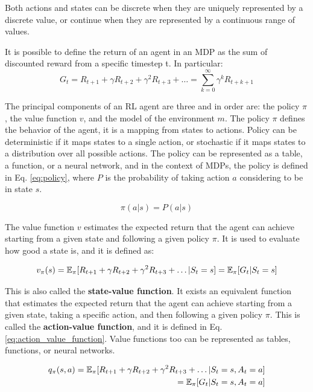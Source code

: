 Both actions and states can be discrete when they are uniquely represented by a discrete value, or continue when they are represented by a continuous range of values.

It is possible to define the return of an agent in an MDP as the sum of discounted reward from a specific timestep t.
In particular:
\begin{equation} \label{eq:return}
    G_t = R_{t+1} + \gamma R_{t+2} + \gamma^2 R_{t+3} + \dots = \sum_{k=0}^{\infty} \gamma^k R_{t+k+1}
\end{equation}

The principal components of an RL agent are three and in order are: the policy $\pi$, the value function $v$, and the model of the environment $m$.
The policy $\pi$ defines the behavior of the agent, it is a mapping from states to actions.
Policy can be deterministic if it maps states to a single action, or stochastic if it maps states to a distribution over all possible actions.
The policy can be represented as a table, a function, or a neural network, and in the context of MDPs, the policy is defined in Eq. \ref{eq:policy}, where $P$ is the probability of taking action $a$ considering to be in state $s$.

\begin{equation} \label{eq:policy}
    \pi(a|s) = P(a|s)
\end{equation}



The value function $v$ estimates the expected return that the agent can achieve starting from a given state and following a given policy $\pi$.
It is used to evaluate how good a state is, and it is defined as:

\begin{equation} \label{eq:value_function}
    v_{\pi}(s) = \operatorname{\mathbb{E}}_{\pi}[R_{t+1} + \gamma R_{t+2} + \gamma^2 R_{t+3} + \dots | S_t = s] = \operatorname{\mathbb{E}}_{\pi}[G_t | S_t = s]
\end{equation}

This is also called the \textbf{state-value function}.
It exists an equivalent function that estimates the expected return that the agent can achieve starting from a given state, taking a specific action, and then following a given policy $\pi$.
This is called the \textbf{action-value function}, and it is defined in Eq. \ref{eq:action_value_function}.
Value functions too can be represented as tables, functions, or neural networks.

\begin{equation} \label{eq:action_value_function}
\begin{split}
    q_{\pi}(s, a) = \operatorname{\mathbb{E}}_{\pi}[R_{t+1} + \gamma R_{t+2} + \gamma^2 R_{t+3} + \dots | S_t = s, A_t = a] \\
    = \operatorname{\mathbb{E}}_{\pi}[G_t | S_t = s, A_t = a]
\end{split}
\end{equation}



